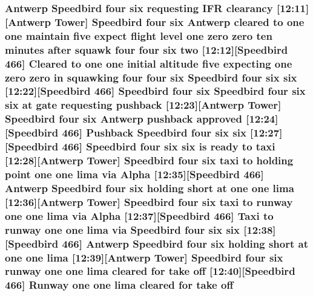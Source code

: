 \subsubsection[{\texorpdfstring{off}{off}}]{\setlength{\rightskip}{0pt plus 5cm}Antwerp Speedbird four {\bf six} requesting I\+FR clearancy \mbox{[}12\+:11\mbox{]}\mbox{[}Antwerp {\bf Tower}\mbox{]} Speedbird four {\bf six} Antwerp cleared to {\bf one} {\bf one} maintain five expect flight level {\bf one} {\bf zero} {\bf zero} {\bf ten} minutes after squawk four four {\bf six} {\bf two} \mbox{[}12\+:12\mbox{]}\mbox{[}Speedbird 466\mbox{]} Cleared to {\bf one} {\bf one} initial altitude five expecting {\bf one} {\bf zero} {\bf zero} in {\bf squawking} four four {\bf six} Speedbird four {\bf six} {\bf six} \mbox{[}12\+:22\mbox{]}\mbox{[}Speedbird 466\mbox{]} Speedbird four {\bf six} Speedbird four {\bf six} {\bf six} at gate requesting pushback \mbox{[}12\+:23\mbox{]}\mbox{[}Antwerp {\bf Tower}\mbox{]} Speedbird four {\bf six} Antwerp pushback {\bf approved} \mbox{[}12\+:24\mbox{]}\mbox{[}Speedbird 466\mbox{]} Pushback Speedbird four {\bf six} {\bf six} \mbox{[}12\+:27\mbox{]}\mbox{[}Speedbird 466\mbox{]} Speedbird four {\bf six} {\bf six} is ready to taxi \mbox{[}12\+:28\mbox{]}\mbox{[}Antwerp {\bf Tower}\mbox{]} Speedbird four {\bf six} taxi to holding point {\bf one} {\bf one} {\bf lima} via {\bf Alpha} \mbox{[}12\+:35\mbox{]}\mbox{[}Speedbird 466\mbox{]} Antwerp Speedbird four {\bf six} holding short at {\bf one} {\bf one} {\bf lima} \mbox{[}12\+:36\mbox{]}\mbox{[}Antwerp {\bf Tower}\mbox{]} Speedbird four {\bf six} taxi to runway {\bf one} {\bf one} {\bf lima} via {\bf Alpha} \mbox{[}12\+:37\mbox{]}\mbox{[}Speedbird 466\mbox{]} Taxi to runway {\bf one} {\bf one} {\bf lima} via Speedbird four {\bf six} {\bf six} \mbox{[}12\+:38\mbox{]}\mbox{[}Speedbird 466\mbox{]} Antwerp Speedbird four {\bf six} holding short at {\bf one} {\bf one} {\bf lima} \mbox{[}12\+:39\mbox{]}\mbox{[}Antwerp {\bf Tower}\mbox{]} Speedbird four {\bf six} runway {\bf one} {\bf one} {\bf lima} cleared for take off \mbox{[}12\+:40\mbox{]}\mbox{[}Speedbird 466\mbox{]} {\bf Runway} {\bf one} {\bf one} {\bf lima} cleared for take off}\hypertarget{ATC_8txt_a5e54cdd3ba663e9f1ca689a2edf07d4d}{}\label{ATC_8txt_a5e54cdd3ba663e9f1ca689a2edf07d4d}
